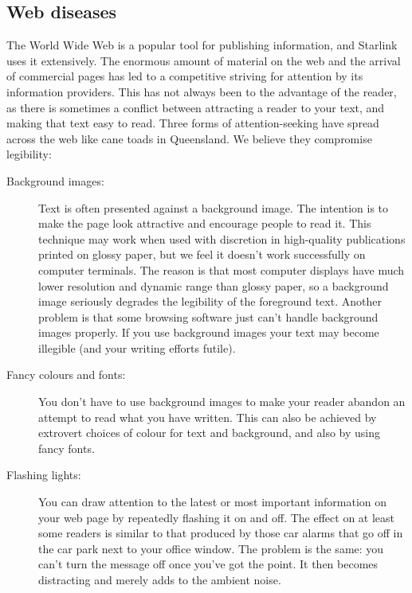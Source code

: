\documentclass[twoside,11pt]{article}
\begin{document}
\subsection{Web diseases}

The World Wide Web is a popular tool for publishing information,
and Starlink uses it extensively.
The enormous amount of material on the web and the arrival of commercial pages
has led to a competitive striving for attention by its information providers.
This has not always been to the advantage of the reader, as there is sometimes
a conflict between attracting a reader to your text, and making that text
easy to read.
Three forms of attention-seeking have spread across the web like cane toads in
Queensland.
We believe they compromise legibility:

\begin{description}

\item [Background images:]

Text is often presented against a background image.
The intention is to make the page look attractive and encourage people to
read it.
This technique may work when used with discretion in high-quality publications
printed on glossy paper, but we feel it doesn't work successfully on computer
terminals.
The reason is that most computer displays have much lower resolution and
dynamic range than glossy paper, so a background image seriously degrades the
legibility of the foreground text.
Another problem is that some browsing software just can't handle background
images properly.
If you use background images your text may become illegible (and your writing
efforts futile).

\item [Fancy colours and fonts:]

You don't have to use background images to make your reader abandon an
attempt to read what you have written.
This can also be achieved by extrovert choices of colour for text and
background, and also by using fancy fonts.

\item [Flashing lights:]

You can draw attention to the latest or most important information on your web
page by repeatedly flashing it on and off.
The effect on at least some readers is similar to that produced by those car
alarms that go off in the car park next to your office window.
The problem is the same: you can't turn the message off once you've got the
point.
It then becomes distracting and merely adds to the ambient noise.

\end{description}
\end{document}
